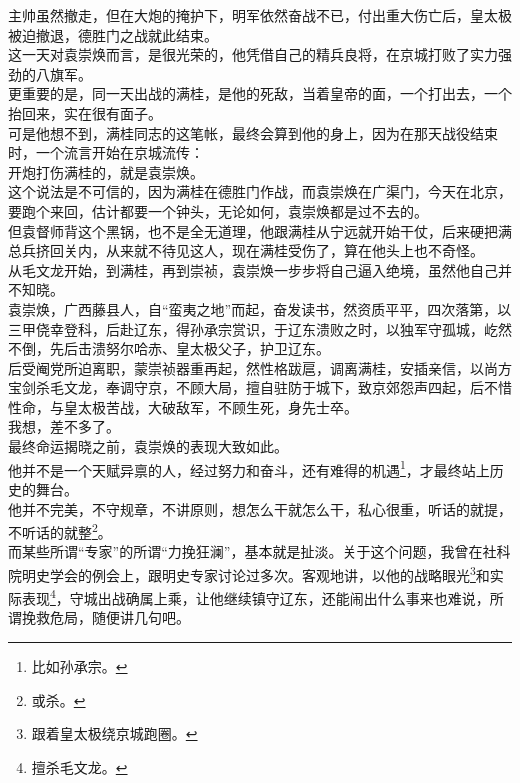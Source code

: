 \begin{multicols}{\theparacolNo}
主帅虽然撤走，但在大炮的掩护下，明军依然奋战不已，付出重大伤亡后，皇太极被迫撤退，德胜门之战就此结束。\\

这一天对袁崇焕而言，是很光荣的，他凭借自己的精兵良将，在京城打败了实力强劲的八旗军。\\

更重要的是，同一天出战的满桂，是他的死敌，当着皇帝的面，一个打出去，一个抬回来，实在很有面子。\\

可是他想不到，满桂同志的这笔帐，最终会算到他的身上，因为在那天战役结束时，一个流言开始在京城流传：\\

开炮打伤满桂的，就是袁崇焕。\\

这个说法是不可信的，因为满桂在德胜门作战，而袁崇焕在广渠门，今天在北京，要跑个来回，估计都要一个钟头，无论如何，袁崇焕都是过不去的。\\

但袁督师背这个黑锅，也不是全无道理，他跟满桂从宁远就开始干仗，后来硬把满总兵挤回关内，从来就不待见这人，现在满桂受伤了，算在他头上也不奇怪。\\

从毛文龙开始，到满桂，再到崇祯，袁崇焕一步步将自己逼入绝境，虽然他自己并不知晓。\\

袁崇焕，广西藤县人，自“蛮夷之地”而起，奋发读书，然资质平平，四次落第，以三甲侥幸登科，后赴辽东，得孙承宗赏识，于辽东溃败之时，以独军守孤城，屹然不倒，先后击溃努尔哈赤、皇太极父子，护卫辽东。\\

后受阉党所迫离职，蒙崇祯器重再起，然性格跋扈，调离满桂，安插亲信，以尚方宝剑杀毛文龙，奉调守京，不顾大局，擅自驻防于城下，致京郊怨声四起，后不惜性命，与皇太极苦战，大破敌军，不顾生死，身先士卒。\\

我想，差不多了。\\

最终命运揭晓之前，袁崇焕的表现大致如此。\\

他并不是一个天赋异禀的人，经过努力和奋斗，还有难得的机遇\footnote{比如孙承宗。}，才最终站上历史的舞台。\\

他并不完美，不守规章，不讲原则，想怎么干就怎么干，私心很重，听话的就提，不听话的就整\footnote{或杀。}。\\

而某些所谓“专家”的所谓“力挽狂澜”，基本就是扯淡。关于这个问题，我曾在社科院明史学会的例会上，跟明史专家讨论过多次。客观地讲，以他的战略眼光\footnote{跟着皇太极绕京城跑圈。}和实际表现\footnote{擅杀毛文龙。}，守城出战确属上乘，让他继续镇守辽东，还能闹出什么事来也难说，所谓挽救危局，随便讲几句吧。\\


\end{multicols}
